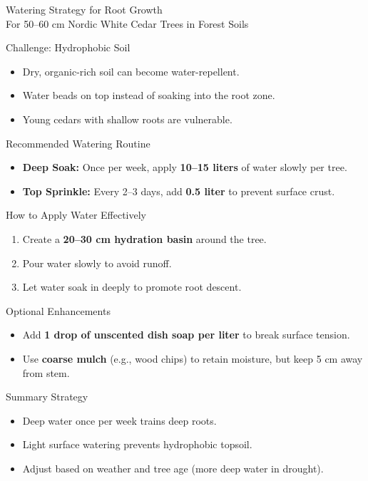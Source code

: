 \documentclass[10pt]{article}
\newcommand{\sectiontitle}[1]{\textcolor{sectionblue}{\headingfont #1}}
\begin{document}
\begin{center}
    {\LARGE \headingfont Watering Strategy for Root Growth 🌊}\\[0.5em]
    \small For 50–60 cm Nordic White Cedar Trees in Forest Soils
\end{center}

\sectiontitle{Challenge: Hydrophobic Soil}
\begin{itemize}
    \item Dry, organic-rich soil can become water-repellent.
    \item Water beads on top instead of soaking into the root zone.
    \item Young cedars with shallow roots are vulnerable.
\end{itemize}

\sectiontitle{Recommended Watering Routine}
\begin{itemize}
    \item \textbf{Deep Soak:} Once per week, apply \textbf{10–15 liters} of water slowly per tree.
    \item \textbf{Top Sprinkle:} Every 2–3 days, add \textbf{0.5 liter} to prevent surface crust.
\end{itemize}

\sectiontitle{How to Apply Water Effectively}
\begin{enumerate}
    \item Create a \textbf{20–30 cm hydration basin} around the tree.
    \item Pour water slowly to avoid runoff.
    \item Let water soak in deeply to promote root descent.
\end{enumerate}

\sectiontitle{Optional Enhancements}
\begin{itemize}
    \item Add \textbf{1 drop of unscented dish soap per liter} to break surface tension.
    \item Use \textbf{coarse mulch} (e.g., wood chips) to retain moisture, but keep 5 cm away from stem.
\end{itemize}

\sectiontitle{Summary Strategy}
\begin{itemize}
    \item Deep water once per week trains deep roots.
    \item Light surface watering prevents hydrophobic topsoil.
    \item Adjust based on weather and tree age (more deep water in drought).
\end{itemize}
\end{document}
